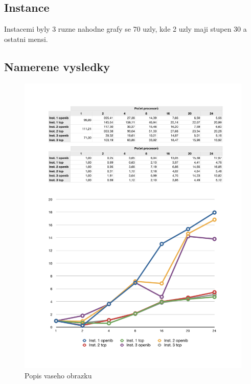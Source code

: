 \documentclass[a4paper]{article}
\begin{document}
\subsection{Instance}

Instacemi byly 3 ruzne nahodne grafy se 70 uzly, kde 2 uzly maji stupen 30 a ostatni mensi.

\subsection{Namerene vysledky}

\begin{figure}[ht]
\centerline{\includegraphics[width=\textwidth]{table-abs.pdf}}
\caption{Popis vaseho obrazku}
\label{table-abs}
\end{figure}
\end{document}
